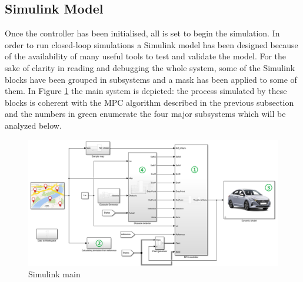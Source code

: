 \subsection{Simulink Model}

Once the controller has been initialised, all is set to begin the simulation.
In order to run closed-loop simulations a Simulink model has been designed because of the availability of many useful tools to test and validate the model. For the sake of clarity in reading and debugging the whole system, some of the Simulink blocks have been grouped in subsystems and a mask has been applied to some of them. 
In Figure \ref{fig:simulink_main} the main system is depicted: the process simulated by these blocks is coherent with the MPC algorithm described in the previous subsection and the numbers in green enumerate the four major subsystems which will be analyzed below.

\begin{figure}[H]
    \centering
    \includegraphics[width=\textwidth]{Figures/simulink_main.png}
    \caption{Simulink main}
    \label{fig:simulink_main}
\end{figure}

